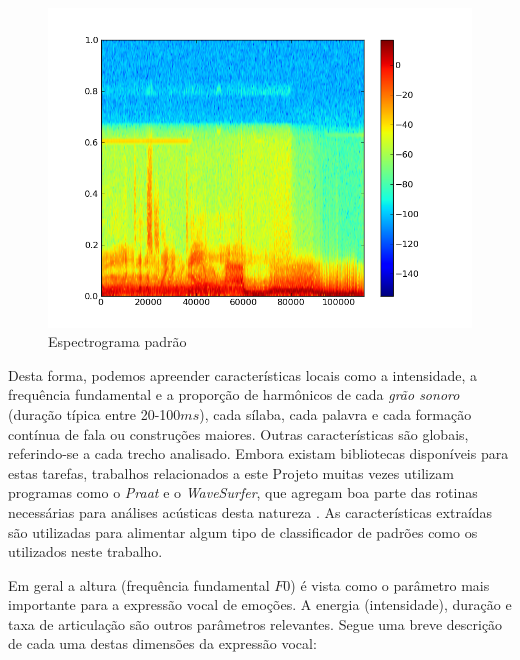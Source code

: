 \documentclass[12pt]{article}
\begin{document}
\begin{figure}
\begin{center}
\includegraphics[scale=.4]{spec2.png}
\caption{Espectrograma padrão}
\label{fig:espec}
\end{center}
\end{figure}

Desta forma, podemos apreender características locais como a intensidade, a frequência fundamental e a proporção de harmônicos de cada \emph{grão sonoro} (duração típica entre 20-100$ms$), cada sílaba, cada palavra e cada formação contínua de fala ou construções maiores. Outras características são globais, referindo-se a cada trecho analisado. Embora existam bibliotecas disponíveis para estas tarefas, trabalhos relacionados a este Projeto muitas vezes utilizam programas como o \emph{Praat} e o \emph{WaveSurfer}, que agregam boa parte das rotinas necessárias para análises acústicas desta natureza \cite{autoreview,autoemotive}. As características extraídas são utilizadas para alimentar algum tipo de classificador de padrões como os utilizados neste trabalho.

Em geral a altura (frequência fundamental $F0$) é vista como o parâmetro mais importante para a expressão vocal de emoções. A energia (intensidade), duração e taxa de articulação são outros parâmetros relevantes. Segue uma breve descrição de cada uma destas dimensões da expressão vocal:
\end{document}
